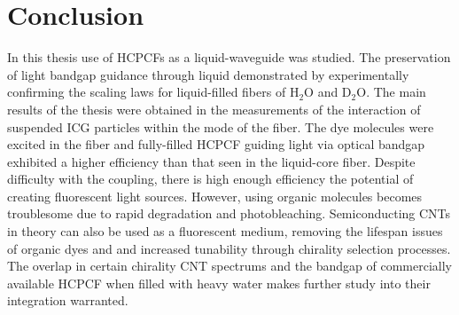 \chapter{Conclusion}
In this thesis use of  HCPCFs as a liquid-waveguide was studied. The preservation of light bandgap guidance through liquid demonstrated by experimentally confirming the scaling laws for liquid-filled fibers of H${}_2$O and D${}_2$O.
The main results of the thesis were obtained in the measurements of the interaction of suspended ICG particles within the mode of the fiber. The dye molecules were excited in the fiber and fully-filled HCPCF guiding light via optical bandgap exhibited a higher efficiency than that seen in the liquid-core fiber. Despite difficulty with the coupling, there is high enough efficiency the potential of creating fluorescent light sources. However, using organic molecules becomes troublesome due to rapid degradation and photobleaching. Semiconducting CNTs in theory can also be used as a fluorescent medium, removing the lifespan issues of organic dyes and and increased tunability through chirality selection processes. The overlap in certain chirality CNT spectrums and the bandgap of commercially available HCPCF when filled with heavy water makes further study into their integration warranted. 